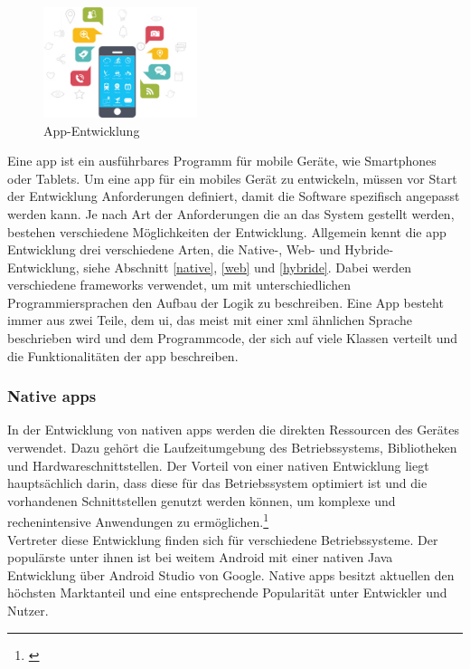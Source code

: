 \begin{figure}
	\begin{center}
		\includegraphics[width=0.4\textwidth]{images/technische_grundlagen/App-Development.jpg}
	\end{center}
	\caption{App-Entwicklung \cite{Nethority.Web&App}}	
	\label{fig:appentwicklung}
\end{figure}

Eine \gls{app} ist ein ausführbares Programm für mobile Geräte, wie Smartphones oder Tablets. Um eine \gls{app} für ein mobiles Gerät zu entwickeln, müssen vor Start der Entwicklung Anforderungen definiert, damit die Software spezifisch angepasst werden kann. Je nach Art der Anforderungen die an das System gestellt werden, bestehen verschiedene Möglichkeiten der Entwicklung. Allgemein kennt die \gls{app} Entwicklung drei verschiedene Arten, die Native-, Web- und Hybride-Entwicklung, siehe Abschnitt \eqref{native}, \eqref{web} und \eqref{hybride}. Dabei werden verschiedene \glspl{framework} verwendet, um mit unterschiedlichen Programmiersprachen den Aufbau der Logik zu beschreiben. Eine App besteht immer aus zwei Teile, dem \gls{ui}, das meist mit einer \gls{xml} ähnlichen Sprache beschrieben wird und dem Programmcode, der sich auf viele Klassen verteilt und die Funktionalitäten der \gls{app} beschreiben.

\subsubsection{Native \glspl{app}}\label{native}

In der Entwicklung von nativen \glspl{app} werden die direkten Ressourcen des Gerätes verwendet. Dazu gehört die Laufzeitumgebung des Betriebssystems, Bibliotheken und Hardwareschnittstellen. Der Vorteil von einer nativen Entwicklung liegt hauptsächlich darin, dass diese für das Betriebssystem optimiert ist und die vorhandenen Schnittstellen genutzt werden können, um komplexe und rechenintensive Anwendungen zu ermöglichen.\footnote{\citep[vgl.][Unterschiede und Vergleich native Apps vs. Web Apps]{DanielWurstl.Unterschiedeund}\label{note1x}}\\
Vertreter diese Entwicklung finden sich für verschiedene Betriebssysteme. Der populärste unter ihnen ist bei weitem Android mit einer nativen Java Entwicklung über Android Studio von Google. Native \glspl{app} besitzt aktuellen den höchsten Marktanteil und eine entsprechende Popularität unter Entwickler und Nutzer.

